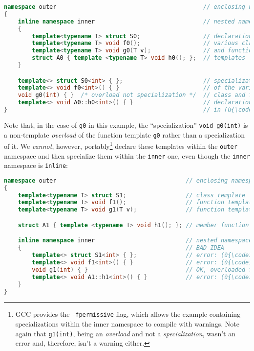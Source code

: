 \begin{lstlisting}[language=C++]
namespace outer                                          // enclosing namespace
{
    inline namespace inner                               // nested namespace
    {
        template<typename T> struct S0;                  // declarations of
        template<typename T> void f0();                  // various class
        template<typename T> void g0(T v);               // and function
        struct A0 { template <typename T> void h0(); };  // templates
    }

    template<> struct S0<int> { };                       // specializations
    template<> void f0<int>() { }                        // of the various
    void g0(int) { }  /* overload not specialization */  // class and function
    template<> void A0::h0<int>() { }                    // declarations above
}                                                        // in (ù{\codeincomments{outer}}ù) namespace
\end{lstlisting}

\noindent Note that, in the case of \texttt{g0} in this example, the
``specialization'' \texttt{void}~\texttt{g0(int)} is a non-template
\emph{overload} of the function template \texttt{g0} rather than a
specialization of it. We \emph{cannot}, however,
portably{\cprotect\footnote{GCC provides the \texttt{-fpermissive} flag,
which allows the example containing specializations within the inner
namespace to compile with warnings. Note again that \texttt{g1(int)},
being an \emph{overload} and not a \emph{specialization}, wasn't an
  error and, therefore, isn't a warning either.}} declare these
templates within the \texttt{outer} namespace and then specialize them
within the \texttt{inner} one, even though the \texttt{inner} namespace
is \texttt{inline}:

\begin{lstlisting}[language=C++]
namespace outer                                     // enclosing namespace
{
    template<typename T> struct S1;                 // class template
    template<typename T> void f1();                 // function template
    template<typename T> void g1(T v);              // function template

    struct A1 { template <typename T> void h1(); }; // member function template

    inline namespace inner                          // nested namespace
    {                                               // BAD IDEA
        template<> struct S1<int> { };              // error: (ù{\codeincomments{S1}}ù) not a template
        template<> void f1<int>() { }               // error: (ù{\codeincomments{f1}}ù) not a template
        void g1(int) { }                            // OK, overloaded function
        template<> void A1::h1<int>() { }           // error: (ù{\codeincomments{h1}}ù) not a template
    }
}
\end{lstlisting}

